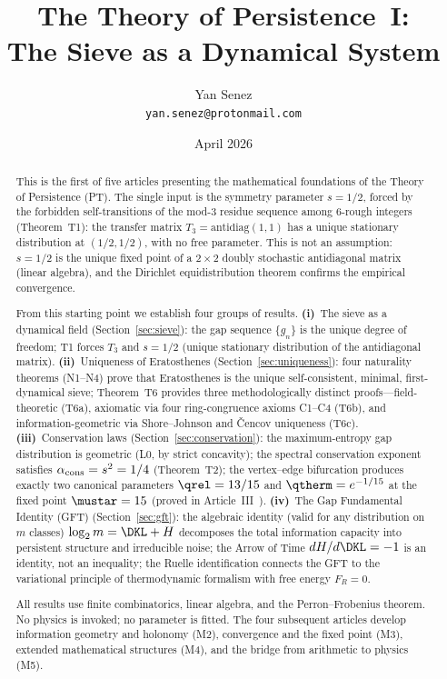 \documentclass[12pt,a4paper]{article}
\title{\textbf{The Theory of Persistence~I:\\The Sieve as a Dynamical System}}
\author{Yan Senez\\\texttt{yan.senez@protonmail.com}}
\date{April 2026}
\begin{document}
\maketitle

\begin{abstract}
This is the first of five articles presenting the mathematical
foundations of the Theory of Persistence (PT).  The single input is
the symmetry parameter $s = 1/2$, forced by the forbidden
self-transitions of the mod-$3$ residue sequence among $6$-rough
integers (Theorem~T1): the transfer matrix
$T_3 = \mathrm{antidiag}(1,1)$ has a unique stationary distribution
at $(1/2, 1/2)$, with no free parameter.  This is not an assumption:
$s = 1/2$ is the unique fixed point of a $2 \times 2$ doubly
stochastic antidiagonal matrix (linear algebra), and the Dirichlet
equidistribution theorem confirms the empirical convergence.

From this starting point we establish four groups of results.
\textbf{(i)}~The sieve as a dynamical field (Section~\ref{sec:sieve}):
the gap sequence $\{g_n\}$ is the unique degree of freedom;
T1 forces $T_3$ and $s = 1/2$ (unique stationary distribution of the
antidiagonal matrix).
\textbf{(ii)}~Uniqueness of Eratosthenes (Section~\ref{sec:uniqueness}):
four naturality theorems (N1--N4) prove that Eratosthenes is the unique
self-consistent, minimal, first-dynamical sieve; Theorem~T6 provides
three methodologically distinct proofs---field-theoretic (T6a), axiomatic via four
ring-congruence axioms C1--C4 (T6b), and information-geometric via
Shore--Johnson and \v{C}encov uniqueness (T6c).
\textbf{(iii)}~Conservation laws (Section~\ref{sec:conservation}):
the maximum-entropy gap distribution is geometric (L0, by strict
concavity); the spectral conservation exponent satisfies
$\alpha_{\rm cons} = s^2 = 1/4$ (Theorem~T2); the vertex--edge
bifurcation produces exactly two canonical parameters
$\qrel = 13/15$ and $\qtherm = e^{-1/15}$ at the fixed point
$\mustar = 15$ (proved in Article~III~\cite{companion_M3}).
\textbf{(iv)}~The Gap Fundamental Identity (GFT) (Section~\ref{sec:gft}):
the algebraic identity (valid for any distribution on $m$ classes)
$\log_2 m = \DKL + H$ decomposes the
total information capacity into persistent structure and irreducible
noise; the Arrow of Time $dH/d\DKL = -1$ is an identity, not an
inequality; the Ruelle identification connects the GFT to the
variational principle of thermodynamic formalism with free energy
$F_R = 0$.

All results use finite combinatorics, linear algebra, and the
Perron--Frobenius theorem.  No physics is invoked; no parameter is
fitted.  The four subsequent articles develop information geometry
and holonomy (M2), convergence and the fixed point (M3), extended
mathematical structures (M4), and the bridge from arithmetic to
physics (M5).
\end{abstract}
\end{document}
